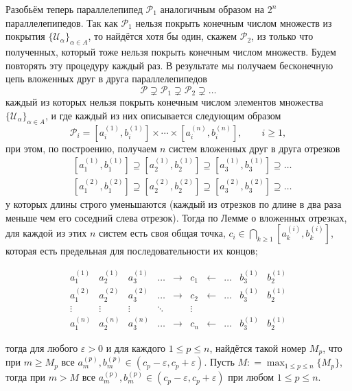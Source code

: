 \documentclass[a4paper]{article}
\begin{document}
Разобьём теперь параллелепипед $\mathcal{P}_1$ аналогичным образом на $2^n$ параллелепипедов. Так как $\mathcal{P}_1$ нельзя покрыть конечным числом множеств из покрытия $\{ \mathscr{U}_\alpha\}_{\alpha \in A}$, то найдётся хотя бы один, скажем $\mathcal{P}_2$, из только что полученных, который тоже нельзя покрыть конечным числом множеств. Будем повторять эту процедуру каждый раз. В результате мы получаем бесконечную цепь вложенных друг в друга параллелепипедов 
$$
\mathcal{P} \supsetneq \mathcal{P}_1 \supsetneq \mathcal{P}_2 \supsetneq \ldots
$$
каждый из которых нельзя покрыть конечным числом элементов множества $\{\mathscr{U}_\alpha\}_{\alpha \in A}$, и где каждый из них описывается следующим образом
$$
\mathcal{P}_i = \left[a_i^{(1)}, b_i^{(1)} \right] \times \cdots \times \left[a_i^{(n)}, b_i^{(n)} \right], \qquad i \ge 1,
$$
при этом, по построению, получаем $n$ систем вложенных друг в друга отрезков
\begin{align*}
& \left[ a_1^{(1)}, b_1^{(1)} \right] \supseteq \left[ a_2^{(1)}, b_2^{(1)} \right] \supseteq \left[ a_3^{(1)}, b_3^{(1)} \right] \supseteq \ldots \\
& \left[ a_1^{(2)}, b_1^{(2)} \right] \supseteq \left[ a_2^{(2)}, b_2^{(2)} \right] \supseteq \left[ a_3^{(2)}, b_3^{(2)} \right] \supseteq \ldots 
\end{align*}
у которых длины строго уменьшаются (каждый из отрезков по длине в два раза меньше чем его соседний слева отрезок). Тогда по Лемме о вложенных отрезках, для каждой из этих $n$ систем есть своя общая точка, $c_i \in \bigcap_{k \ge 1} [ a_k^{(i)}, b_k^{(i)} ] $, которая есть предельная для последовательности их концов; 

$$
\begin{matrix}
a_1^{(1)} & a_2^{(1)} & a_3^{(1)}& \ldots  & \to & c_1 & \leftarrow & \ldots & b_3^{(1)} & b_2^{(1)}  \\
a_1^{(2)} & a_2^{(2)} & a_3^{(2)}& \ldots  & \to & c_2 & \leftarrow & \ldots & b_3^{(1)} & b_2^{(1)}  \\
\vdots & \vdots &\vdots & \ddots && \vdots && && \\
a_1^{(n)} & a_2^{(n)} & a_3^{(n)}& \ldots  & \to & c_n & \leftarrow & \ldots & b_3^{(1)} & b_2^{(1)}  
\end{matrix}
$$

тогда для любого $\varepsilon >0$ и для каждого $1\le p \le n$, найдётся такой номер $M_p$, что при $m \ge M_p$ все $a_m^{(p)}, b_m^{(p)} \in (c_p - \varepsilon, c_p + \varepsilon)$. Пусть $M: = \max_{1 \le p \le n}\{M_p\}$, тогда при $m > M$ все $a_m^{(p)}, b_m^{(p)} \in (c_p - \varepsilon, c_p + \varepsilon)$ при любом $1\le p \le n.$
\end{document}
